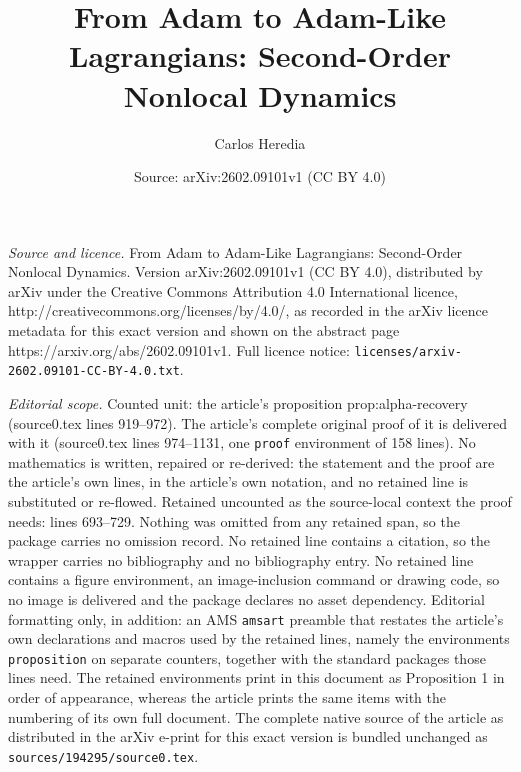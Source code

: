 \documentclass[10pt,a4paper]{amsart}
\title{From Adam to Adam-Like Lagrangians: Second-Order Nonlocal Dynamics}
\author{Carlos Heredia}
\date{Source: arXiv:2602.09101v1 (CC BY 4.0)}
\begin{document}
\maketitle

\noindent\emph{Source and licence.} From Adam to Adam-Like Lagrangians: Second-Order Nonlocal Dynamics. Version arXiv:2602.09101v1 (CC BY 4.0), distributed by arXiv under the Creative Commons Attribution 4.0 International licence, http://creativecommons.org/licenses/by/4.0/, as recorded in the arXiv licence metadata for this exact version and shown on the abstract page https://arxiv.org/abs/2602.09101v1. Full licence notice: \texttt{licenses/arxiv-2602.09101-CC-BY-4.0.txt}.\par\smallskip

\noindent\textit{Editorial scope.} Counted unit: the article's proposition prop:alpha-recovery (source0.tex lines 919--972). The article's complete original proof of it is delivered with it (source0.tex lines 974--1131, one \texttt{proof} environment of 158 lines). No mathematics is written, repaired or re-derived: the statement and the proof are the article's own lines, in the article's own notation, and no retained line is substituted or re-flowed.  Retained uncounted as the source-local context the proof needs: lines 693--729.  Nothing was omitted from any retained span, so the package carries no omission record.  No retained line contains a citation, so the wrapper carries no bibliography and no bibliography entry.  No retained line contains a figure environment, an image-inclusion command or drawing code, so no image is delivered and the package declares no asset dependency.  Editorial formatting only, in addition: an AMS \texttt{amsart} preamble that restates the article's own declarations and macros used by the retained lines, namely the environments \texttt{proposition} on separate counters, together with the standard packages those lines need.  The retained environments print in this document as Proposition 1 in order of appearance, whereas the article prints the same items with the numbering of its own full document.  The complete native source of the article as distributed in the arXiv e-print for this exact version is bundled unchanged as \texttt{sources/194295/source0.tex}.
\end{document}
